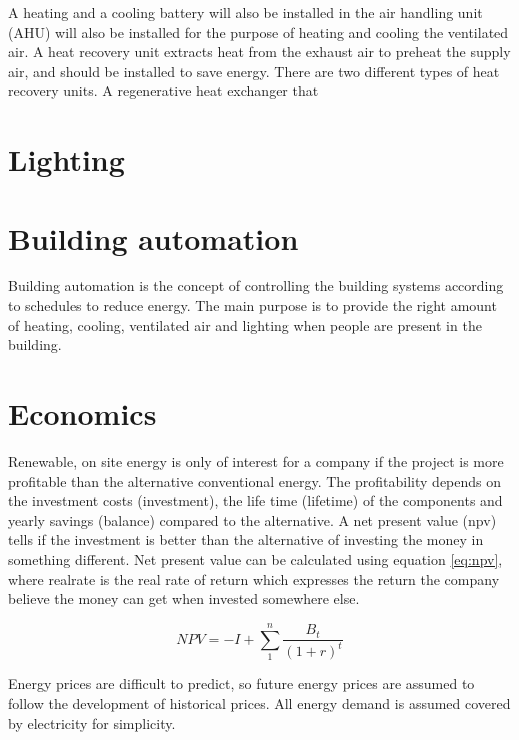 A heating and a cooling battery will also be installed in the air handling unit (\ac{AHU}) will also be installed for the purpose of heating and cooling the ventilated air. A heat recovery unit extracts heat from the exhaust air to preheat the supply air, and should be installed to save energy. There are two different types of heat recovery units. A regenerative heat exchanger that 

\section{Lighting}


\section{Building automation}
Building automation is the concept of controlling the building systems according to schedules to reduce energy. The main purpose is to provide the right amount of heating, cooling, ventilated air and lighting when people are present in the building. 

\section{Economics}
Renewable, on site energy is only of interest for a company if the project is more profitable than the alternative conventional energy. The profitability depends on the investment costs (\ac{investment}), the life time (\ac{lifetime}) of the components and yearly savings (\ac{balance}) compared to the alternative. A net present value (\ac{npv}) tells if the investment is better than the alternative of investing the money in something different. Net present value can be calculated using equation \ref{eq:npv}, where \ac{realrate} is the real rate of return which expresses the return the company believe the money can get when invested somewhere else. 

\begin{equation}
    NPV = -I + \sum_1^n \frac{B_t}{(1+r)^t}
    \label{eq:npv}
\end{equation}

Energy prices are difficult to predict, so future energy prices are assumed to follow the development of historical prices. All energy demand is assumed covered by electricity for simplicity. 